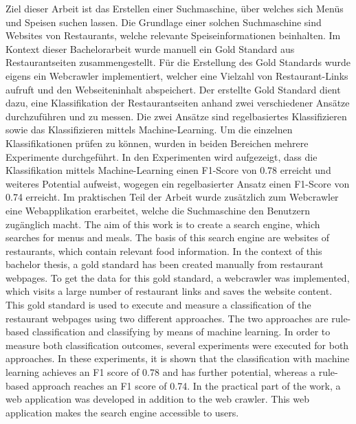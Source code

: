 Ziel dieser Arbeit ist das Erstellen einer Suchmaschine, über welches sich Menüs und Speisen suchen lassen.
Die Grundlage einer solchen Suchmaschine sind Websites von Restaurants, welche relevante Speiseinformationen beinhalten.
Im Kontext dieser Bachelorarbeit wurde manuell ein Gold Standard aus Restaurantseiten zusammengestellt.
Für die Erstellung des Gold Standards wurde eigens ein Webcrawler implementiert, welcher eine Vielzahl von Restaurant-Links aufruft und den Webseiteninhalt abspeichert.
Der erstellte Gold Standard dient dazu, eine Klassifikation der Restaurantseiten anhand zwei verschiedener Ansätze durchzuführen und zu messen.
Die zwei Ansätze sind regelbasiertes Klassifizieren sowie das Klassifizieren mittels Machine-Learning.
Um die einzelnen Klassifikationen prüfen zu können, wurden in beiden Bereichen mehrere Experimente durchgeführt.
In den Experimenten wird aufgezeigt, dass die Klassifikation mittels Machine-Learning einen F1-Score von 0.78 erreicht und weiteres Potential aufweist, wogegen ein regelbasierter Ansatz einen F1-Score von 0.74 erreicht.
Im praktischen Teil der Arbeit wurde zusätzlich zum Webcrawler eine Webapplikation erarbeitet, welche die Suchmaschine den Benutzern zugänglich macht.
The aim of this work is to create a search engine, which searches for menus and meals.
The basis of this search engine are websites of restaurants, which contain relevant food information.
In the context of this bachelor thesis, a gold standard has been created manually from restaurant webpages.
To get the data for this gold standard, a webcrawler was implemented, which visits a large number of restaurant links and saves the website content.
This gold standard is used to execute and measure a classification of the restaurant webpages using two different approaches.
The two approaches are rule-based classification and classifying by means of machine learning.
In order to measure both classification outcomes, several experiments were executed for both approaches.
In these experiments, it is shown that the classification with machine learning achieves an F1 score of 0.78 and has further potential, whereas a rule-based approach reaches an F1 score of 0.74.
In the practical part of the work, a web application was developed in addition to the web crawler.
This web application makes the search engine accessible to users.
